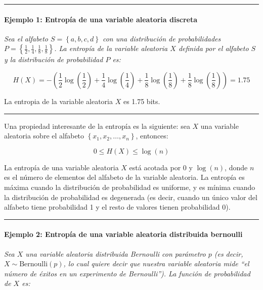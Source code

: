 \begin{center}\rule{0.5\linewidth}{0.5pt}\end{center}

\paragraph{Ejemplo 1: Entropía de una variable aleatoria
discreta}\label{ejemplo-1-entropuxeda-de-una-variable-aleatoria-discreta}

\emph{Sea el alfabeto \(S=\left\{a,b,c,d\right\}\) con una distribución
de probabilidades
\(P=\left\{\frac{1}{2},\frac{1}{4},\frac{1}{8},\frac{1}{8}\right\}\). La
entropía de la variable aleatoria \(X\) definida por el alfabeto \(S\) y
la distribución de probabilidad \(P\) es:}

\[
H(X) = -\left(\frac{1}{2}\log\left(\frac{1}{2}\right) + \frac{1}{4}\log\left(\frac{1}{4}\right) + \frac{1}{8}\log\left(\frac{1}{8}\right) + \frac{1}{8}\log\left(\frac{1}{8}\right)\right) = 1.75
\]

La entropia de la variable aleatoria \(X\) es 1.75 bits.

\begin{center}\rule{0.5\linewidth}{0.5pt}\end{center}

Una propiedad interesante de la entropía es la siguiente: sea \(X\) una
variable aleatoria sobre el alfabeto
\(\left\{x_1,x_2,\dots,x_n\right\}\), entonces:

\[
0 \leq H(X) \leq \log(n)
\]

La entropía de una variable aleatoria \(X\) está acotada por \(0\) y
\(\log(n)\), donde \(n\) es el número de elementos del alfabeto de la
variable aleatoria. La entropía es máxima cuando la distribución de
probabilidad es uniforme, y es mínima cuando la distribución de
probabilidad es degenerada (es decir, cuando un único valor del alfabeto
tiene probabilidad 1 y el resto de valores tienen probabilidad 0).

\begin{center}\rule{0.5\linewidth}{0.5pt}\end{center}

\paragraph{Ejemplo 2: Entropía de una variable aleatoria distribuida
bernoulli}\label{ejemplo-2-entropuxeda-de-una-variable-aleatoria-distribuida-bernoulli}

\emph{Sea \(X\) una variable aleatoria distribuida Bernoulli con
parámetro \(p\) (es decir, \(X\sim\text{Bernoulli}(p)\), lo cual quiere
decir que nuestra variable aleatoria mide ``el número de éxitos en un
experimento de Bernoulli''). La función de probabilidad de \(X\) es:}

